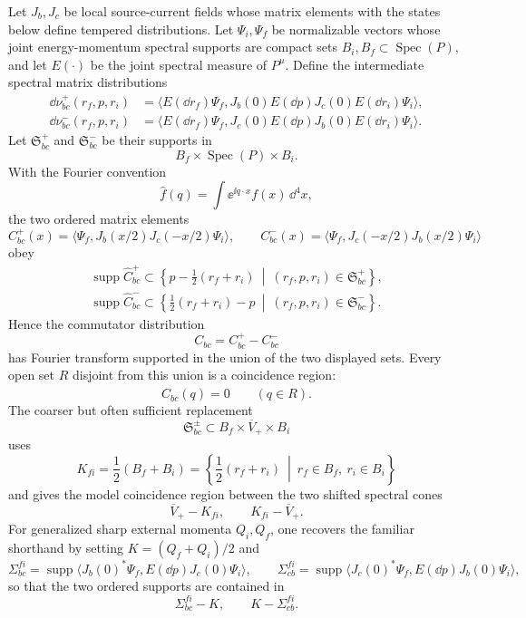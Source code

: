 \begin{proposition}
\label{prop:source-current-commutator-coincidence-region}
Let \(J_b,J_c\) be local source-current fields whose matrix elements with the
states below define tempered distributions.  Let \(\Psi_i,\Psi_f\) be
normalizable vectors whose joint energy-momentum spectral supports are compact
sets \(B_i,B_f\subset\operatorname{Spec}(P)\), and let \(E(\cdot)\) be the
joint spectral measure of \(P^\mu\).  Define the intermediate spectral
matrix distributions
\begin{align}
  \dd\nu^+_{bc}(r_f,p,r_i)
  &=
  \langle E(\dd r_f)\Psi_f,
    J_b(0)E(\dd p)J_c(0)E(\dd r_i)\Psi_i\rangle,
  \nonumber\\
  \dd\nu^-_{bc}(r_f,p,r_i)
  &=
  \langle E(\dd r_f)\Psi_f,
    J_c(0)E(\dd p)J_b(0)E(\dd r_i)\Psi_i\rangle .
  \label{eq:source-current-intermediate-spectral-distributions}
\end{align}
Let \(\mathfrak S^+_{bc}\) and \(\mathfrak S^-_{bc}\) be their supports in
\[
  B_f\times\operatorname{Spec}(P)\times B_i .
\]
With the
Fourier convention
\[
  \widehat f(q)=\int\ee^{\ii q\cdot x}f(x)\,\dd^4x,
\]
the two ordered matrix elements
\[
  C^+_{bc}(x)=
  \langle\Psi_f,J_b(x/2)J_c(-x/2)\Psi_i\rangle,
  \qquad
  C^-_{bc}(x)=
  \langle\Psi_f,J_c(-x/2)J_b(x/2)\Psi_i\rangle
\]
obey
\begin{align}
  \operatorname{supp}\widehat C^+_{bc}
  \subset
  \left\{
    p-\frac12(r_f+r_i)
    \ \middle|\ (r_f,p,r_i)\in\mathfrak S^+_{bc}
  \right\},
  \nonumber\\
  \operatorname{supp}\widehat C^-_{bc}
  \subset
  \left\{
    \frac12(r_f+r_i)-p
    \ \middle|\ (r_f,p,r_i)\in\mathfrak S^-_{bc}
  \right\}.
  \label{eq:source-current-ordered-supports-wavepacket}
\end{align}
Hence the commutator distribution
\[
  C_{bc}=C^+_{bc}-C^-_{bc}
\]
has Fourier transform supported in the union of the two displayed sets.
Every open set \(R\) disjoint from this union is a coincidence region:
\begin{equation}
  \widehat C_{bc}(q)=0\qquad(q\in R).
  \label{eq:source-current-coincidence-vanishing}
\end{equation}
The coarser but often sufficient replacement
\[
  \mathfrak S^\pm_{bc}\subset
  B_f\times\overline V_+\times B_i
\]
uses
\[
  K_{fi}=\frac12(B_f+B_i)
  =
  \left\{\frac12(r_f+r_i)\ \middle|\ r_f\in B_f,\ r_i\in B_i\right\}
\]
and gives the model coincidence region between the two shifted spectral cones
\[
  \overline V_+-K_{fi},
  \qquad
  K_{fi}-\overline V_+ .
\]
For generalized sharp external momenta \(Q_i,Q_f\), one recovers the familiar
shorthand by setting \(K=(Q_f+Q_i)/2\) and
\[
  \Sigma_{bc}^{fi}=\operatorname{supp}
  \langle J_b(0)^*\Psi_f,E(\dd p)J_c(0)\Psi_i\rangle,
  \qquad
  \Sigma_{cb}^{fi}=\operatorname{supp}
  \langle J_c(0)^*\Psi_f,E(\dd p)J_b(0)\Psi_i\rangle ,
\]
so that the two ordered supports are contained in
\[
  \Sigma_{bc}^{fi}-K,\qquad K-\Sigma_{cb}^{fi}.
\]
\end{proposition}


